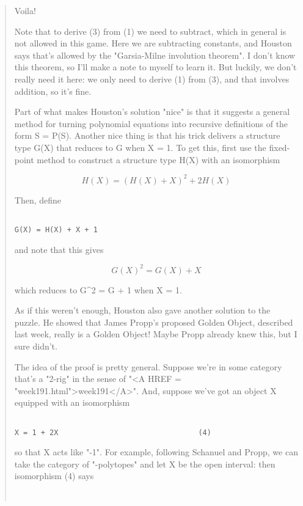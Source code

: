 \begin{quote}
Voila!
             
Note that to derive (3) from (1) we need to subtract, which in general 
is not allowed in this game.  Here we are subtracting constants, and 
Houston says that's allowed by the "Garsia-Milne involution theorem".  
I don't know this theorem, so I'll make a note to myself to learn it.
But luckily, we don't really need it here: we only need to derive (1)
from (3), and that involves addition, so it's fine.

Part of what makes Houston's solution "nice" is that it suggests a 
general method for turning polynomial equations into recursive definitions
of the form S = P(S).  Another nice thing is that his trick delivers 
a structure type G(X) that reduces to G when X = 1.  To get this, first 
use the fixed-point method to construct a structure type H(X) with an
isomorphism


$$

H(X) = (H(X) + X)^{2} + 2H(X)
$$
    
Then, define


\begin{verbatim}

G(X) = H(X) + X + 1 
\end{verbatim}
    
and note that this gives 


$$

G(X)^{2} = G(X) + X
$$
    
which reduces to G^{2} = G + 1 when X = 1.

As if this weren't enough, Houston also gave another solution to the
puzzle.  He showed that James Propp's proposed Golden Object, described 
last week, really is a Golden Object!  Maybe Propp already knew this, 
but I sure didn't.

The idea of the proof is pretty general.  Suppose we're in some category
that's a "2-rig" in the sense 
of "<A HREF = "week191.html">week191</A>".  And, suppose we've 
got an object X equipped with an isomorphism


\begin{verbatim}

X = 1 + 2X                                (4)
\end{verbatim}
    
so that X acts like "-1".  For example, following Schanuel and Propp, 
we can take the category of "\sigma -polytopes" and let X be the open 
interval: then isomorphism (4) says


\begin{verbatim}


\end{verbatim}
\end{quote}
